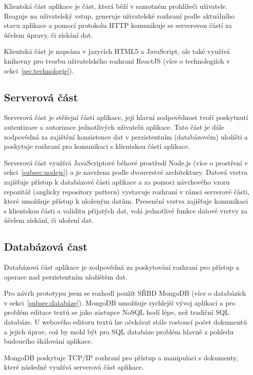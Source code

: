 Klientská část aplikace je část, která běží v samotném prohlížeči uživatele.
Reaguje na uživatelský vstup, generuje uživatelské rozhraní podle aktuálního stavu aplikace a pomocí protokolu \gls{HTTP} komunikuje se serverovou částí za účelem úpravy, či získání dat.

Klientská část je napsána v jazycích HTML5 a JavaScript, ale také využívá knihovny pro tvorbu uživatelského rozhraní ReactJS (více o technologiích v sekci~\ref{sec:technologie}).

\subsection{Serverová část}\label{subsec:serverováČást}

Serverová část je stěžejní částí aplikace, její hlavní zodpovědnost tvoří poskytnutí autentizace a autorizace jednotlivých uživatelů aplikace.
Tato část je dále zodpovědná za zajištění konzistence dat v perzistentním (databázovém) uložišti a poskytuje rozhraní pro komunikaci s klientskou částí aplikace.

Serverová část využívá JavaScriptové běhové prostředí Node.js (více o prostření v sekci~\ref{subsec:nodejs}) a je navržena podle dvouvrstvé architektury.
Datová vrstva zajišťuje přístup k databázové části aplikace a za pomoci návrhového vzoru repozitář (anglicky repository pattern) vystavuje rozhraní v rámci serverové části, které umožňuje přístup k uloženým datům.
Presenční vrstva zajišťuje komunikaci s klientskou části a validitu přijatých dat, volá jednotlivé funkce datové vrstvy za účelem získání, či uložení dat.

\subsection{Databázová čast}\label{subsec:databázováČast}

Databázová část aplikace je zodpovědná za poskytování rozhraní pro přístup a operace nad perzistentním uložištěm dat.

Pro návrh prototypu jsem se rozhodl použít \gls{SŘBD} MongoDB (více o databázích v sekci~\ref{subsec:databáze}).
MongoDB umožňuje rychlejší vývoj aplikací a pro problém editace textů se jako zástupce \gls{NoSQL} hodí lépe, než tradiční \gls{SQL} databáze.
U webového editoru textů lze očekávat stále rostoucí počet dokumentů a jejich úprav, což by mohl být pro \gls{SQL} databáze problém hlavně z pohledu budoucího škálování aplikace.

MongoDB poskytuje \acrshort{TCP/IP} rozhraní pro přístup a manipulaci s dokumenty, které následně využívá serverová část aplikace.

